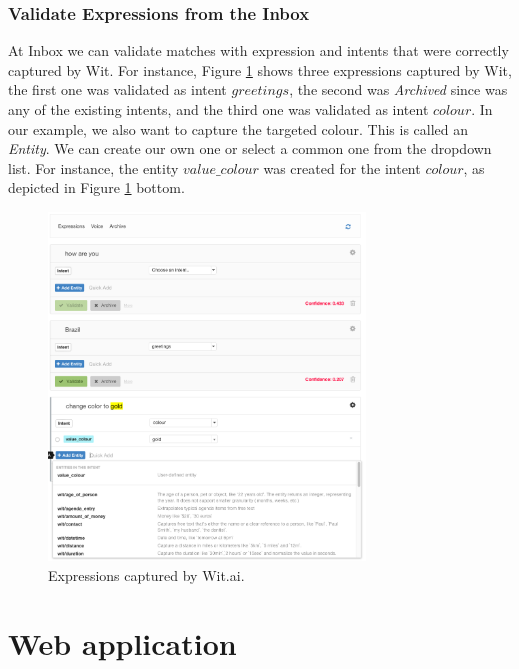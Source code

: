 \documentclass[twoside,11pt]{article}
\begin{document}
\subsubsection{Validate Expressions from the Inbox}


At Inbox we can validate matches with expression and intents that were correctly captured by Wit.
For instance, Figure \ref{fig:expressions} shows three expressions captured by Wit, the first one was validated as intent $greetings$, the second was \emph{Archived} since was any of the existing intents, and the third one was validated as intent $colour$.
In our example, we also want to capture the targeted colour.
This is called an \emph{Entity}. 
We can create our own one or select a common one from the dropdown list. 
For instance, the entity $value\_colour$ was created for the intent $colour$, as depicted in Figure \ref{fig:expressions} bottom.


\begin{figure}[!h]
\begin{center}
    \includegraphics[width=0.75\textwidth]{figures/expressions.png}
    \caption{Expressions captured by Wit.ai.}
    \label{fig:expressions}
\end{center}
\end{figure}

\section{Web application}
\label{sec:web}
\end{document}
